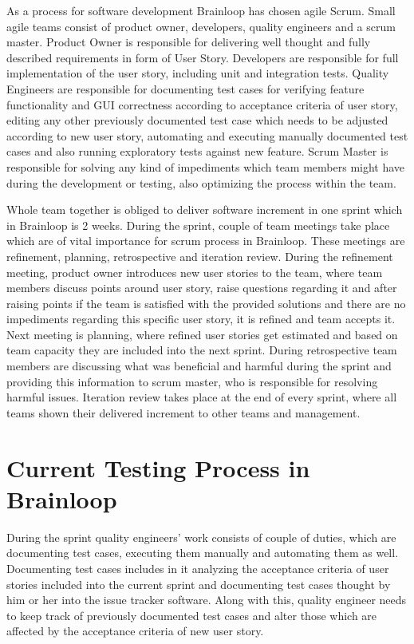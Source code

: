 \par
As a process for software development Brainloop has chosen agile Scrum. Small agile teams consist of product owner, developers, quality engineers and a scrum master. Product Owner is responsible for delivering well thought and fully described requirements in form of User Story. Developers are responsible for full implementation of the user story, including unit and integration tests. Quality Engineers are responsible for documenting test cases for verifying feature functionality and GUI correctness according to acceptance criteria of user story, editing any other previously documented test case which needs to be adjusted according to new user story, automating and executing manually documented test cases and also running exploratory tests against new feature. Scrum Master is responsible for solving any kind of impediments which team members might have during the development or testing, also optimizing the process within the team.

\par
Whole team together is obliged to deliver software increment in one sprint which in Brainloop is 2 weeks. During the sprint, couple of team meetings take place which are of vital importance for scrum process in Brainloop. These meetings are refinement, planning, retrospective and iteration review. During the refinement meeting, product owner introduces new user stories to the team, where team members discuss points around user story, raise questions regarding it and after raising points if the team is satisfied with the provided solutions and there are no impediments regarding this specific user story, it is refined and team accepts it. Next meeting is planning, where refined user stories get estimated and based on team capacity they are included into the next sprint. During retrospective team members are discussing what was beneficial and harmful during the sprint and providing this information to scrum master, who is responsible for resolving harmful issues. Iteration review takes place at the end of every sprint, where all teams shown their delivered increment to other teams and management.

\section{Current Testing Process in Brainloop}


\par
During the sprint quality engineers' work consists of couple of duties, which are documenting test cases, executing them manually and automating them as well. 
Documenting test cases includes in it analyzing the acceptance criteria of user stories included into the current sprint and documenting test cases thought by him or her into the issue tracker software. Along with this, quality engineer needs to keep track of previously documented test cases and alter those which are affected by the acceptance criteria of new user story.

